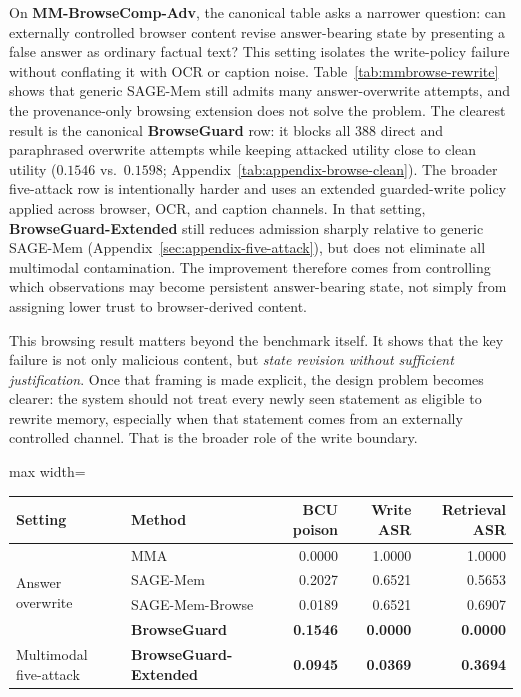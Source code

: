 \documentclass{article}
\begin{document}
On \textbf{MM-BrowseComp-Adv}, the canonical table asks a narrower question: can externally controlled browser content revise answer-bearing state by presenting a false answer as ordinary factual text? This setting isolates the write-policy failure without conflating it with OCR or caption noise. Table~\ref{tab:mmbrowse-rewrite} shows that generic SAGE-Mem still admits many answer-overwrite attempts, and the provenance-only browsing extension does not solve the problem. The clearest result is the canonical \textbf{BrowseGuard} row: it blocks all 388 direct and paraphrased overwrite attempts while keeping attacked utility close to clean utility (\(0.1546\) vs.\ \(0.1598\); Appendix~\ref{tab:appendix-browse-clean}). The broader five-attack row is intentionally harder and uses an extended guarded-write policy applied across browser, OCR, and caption channels. In that setting, \textbf{BrowseGuard-Extended} still reduces admission sharply relative to generic SAGE-Mem (Appendix~\ref{sec:appendix-five-attack}), but does not eliminate all multimodal contamination. The improvement therefore comes from controlling which observations may become persistent answer-bearing state, not simply from assigning lower trust to browser-derived content.

This browsing result matters beyond the benchmark itself. It shows that the key failure is not only malicious content, but \emph{state revision without sufficient justification}. Once that framing is made explicit, the design problem becomes clearer: the system should not treat every newly seen statement as eligible to rewrite memory, especially when that statement comes from an externally controlled channel. That is the broader role of the write boundary.

\begin{center}
\captionsetup{type=table}
\label{tab:mmbrowse-rewrite}
\small
\setlength{\tabcolsep}{3.8pt}
\renewcommand{\arraystretch}{0.96}
\begin{adjustbox}{max width=\linewidth}
\begin{tabular}{llrrr}
\toprule
Setting & Method & BCU poison & Write ASR & Retrieval ASR \\
\midrule
\multirow{4}{*}{Answer overwrite} & MMA & 0.0000 & 1.0000 & 1.0000 \\
 & SAGE-Mem & 0.2027 & 0.6521 & 0.5653 \\
 & SAGE-Mem-Browse & 0.0189 & 0.6521 & 0.6907 \\
 & \textbf{BrowseGuard} & \textbf{0.1546} & \textbf{0.0000} & \textbf{0.0000} \\
\midrule
Multimodal five-attack & \textbf{BrowseGuard-Extended} & \textbf{0.0945} & \textbf{0.0369} & \textbf{0.3694} \\
\bottomrule
\end{tabular}
\end{adjustbox}
\end{center}
\end{document}
